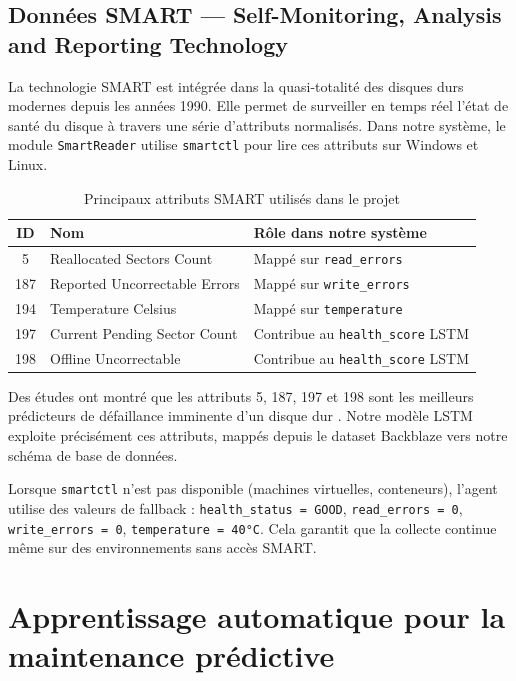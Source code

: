 \subsection{Données SMART — Self-Monitoring, Analysis and Reporting Technology}

La technologie SMART est intégrée dans la quasi-totalité des disques durs modernes
depuis les années 1990. Elle permet de surveiller en temps réel l'état de santé du
disque à travers une série d'attributs normalisés. Dans notre système, le module
\texttt{SmartReader} utilise \texttt{smartctl} pour lire ces attributs sur Windows
et Linux.

\begin{table}[H]
\centering
\caption{Principaux attributs SMART utilisés dans le projet}
\begin{tabularx}{\textwidth}{|c|l|X|}
\hline
\rowcolor{lightblue}
\textbf{ID} & \textbf{Nom} & \textbf{Rôle dans notre système} \\
\hline
5   & Reallocated Sectors Count & Mappé sur \texttt{read\_errors} \\
\hline
187 & Reported Uncorrectable Errors & Mappé sur \texttt{write\_errors} \\
\hline
194 & Temperature Celsius & Mappé sur \texttt{temperature} \\
\hline
197 & Current Pending Sector Count & Contribue au \texttt{health\_score} LSTM \\
\hline
198 & Offline Uncorrectable & Contribue au \texttt{health\_score} LSTM \\
\hline
\end{tabularx}
\end{table}

Des études ont montré que les attributs 5, 187, 197 et 198 sont les meilleurs
prédicteurs de défaillance imminente d'un disque dur \cite{backblaze2020,
pinheiro2007smart}. Notre modèle LSTM exploite précisément ces attributs, mappés
depuis le dataset Backblaze vers notre schéma de base de données.

Lorsque \texttt{smartctl} n'est pas disponible (machines virtuelles, conteneurs),
l'agent utilise des valeurs de fallback : \texttt{health\_status = GOOD},
\texttt{read\_errors = 0}, \texttt{write\_errors = 0}, \texttt{temperature = 40°C}.
Cela garantit que la collecte continue même sur des environnements sans accès SMART.

\section{Apprentissage automatique pour la maintenance prédictive}

